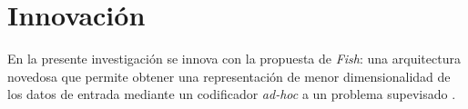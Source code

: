 \section{Innovación}

En la presente investigación se innova con la propuesta de \textit{Fish}: una arquitectura novedosa que permite obtener una representación de menor dimensionalidad de los datos de entrada mediante un codificador \textit{ad-hoc} a un problema supevisado .